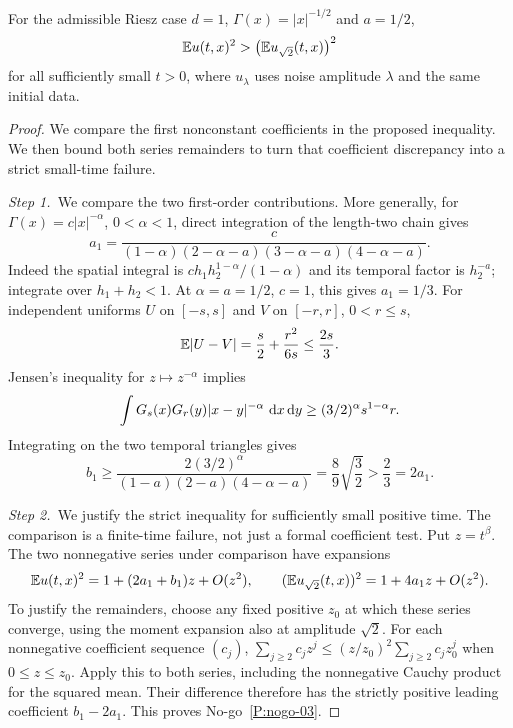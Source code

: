 \setcounter{nogo}{2}
\begin{nogo}
  \label{P:nogo-03}
  For the admissible Riesz case $d=1$, $\Gamma(x)=|x|^{-1/2}$ and $a=1/2$,
  \[
    \mathbb{E} u(t,x)^2>\big(\mathbb{E} u_{\sqrt2}(t,x)\big)^2
  \]
  for all sufficiently small $t>0$, where $u_\lambda$ uses noise amplitude
  $\lambda$ and the same initial data.
\end{nogo}
\begin{proof}
  We compare the first nonconstant coefficients in the proposed inequality. We
  then bound both series remainders to turn that coefficient discrepancy into
  a strict small-time failure.


  \medskip
  \noindent\textit{Step 1.~}We compare the two first-order contributions.
  More generally, for $\Gamma(x)=c|x|^{-\alpha}$, $0<\alpha<1$,
  direct integration of the length-two chain gives
  \[
    a_1=\frac{c}{(1-\alpha)(2-\alpha-a)(3-\alpha-a)(4-\alpha-a)}.
  \]
  Indeed the spatial integral is
  $c h_1h_2^{1-\alpha}/(1-\alpha)$ and its temporal factor is $h_2^{-a}$;
  integrate over $h_1+h_2<1$. At $\alpha=a=1/2$, $c=1$, this gives $a_1=1/3$.
  For independent uniforms $U$ on $[-s,s]$ and $V$ on $[-r,r]$, $0<r\le s$,
  \[
    \mathbb{E}|U-V|=\frac{s}{2}+\frac{r^2}{6s}\le\frac{2s}{3}.
  \]
  Jensen's inequality for $z\mapsto z^{-\alpha}$ implies
  \[
    \int G_s(x)G_r(y)|x-y|^{-\alpha}\,\,\mathrm{d} x\,\mathrm{d} y
    \ge (3/2)^\alpha s^{1-\alpha}r.
  \]
  Integrating on the two temporal triangles gives
  \[
    b_1\ge
    \frac{2(3/2)^\alpha}{(1-a)(2-a)(4-\alpha-a)}
    =\frac89\sqrt{\frac32}>\frac23=2a_1.
  \]

  \medskip
  \noindent\textit{Step 2.~}We justify the strict inequality for sufficiently
  small positive time.
  The comparison is a finite-time failure, not just a formal coefficient test.
  Put $z=t^\beta$. The two nonnegative series under comparison have expansions
  \[
    \mathbb{E} u(t,x)^2=1+(2a_1+b_1)z+O(z^2),\qquad
    (\mathbb{E} u_{\sqrt2}(t,x))^2=1+4a_1z+O(z^2).
  \]
  To justify the remainders, choose any fixed positive $z_0$ at which these
  series converge, using the moment expansion also at amplitude $\sqrt2$.
  For each nonnegative coefficient sequence $(c_j)$,
  $\sum_{j\ge2}c_jz^j\le(z/z_0)^2\sum_{j\ge2}c_jz_0^j$ when
  $0\le z\le z_0$. Apply this to both series, including the nonnegative
  Cauchy product for the squared mean. Their difference therefore has the
  strictly positive leading coefficient $b_1-2a_1$.
  This proves No-go~\ref{P:nogo-03}.
\end{proof}

